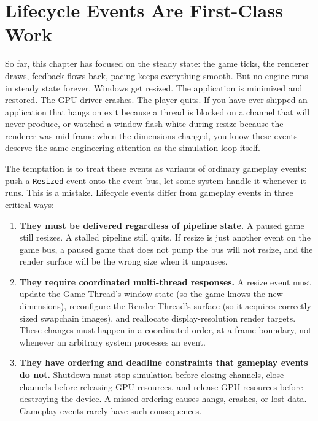 \documentclass[
  11pt,
  letterpaper,
  DIV=11,
  numbers=noendperiod,
  twoside,
  open=right]{scrreprt}
\begin{document}
\section{Lifecycle Events Are First-Class
Work}\label{lifecycle-events-are-first-class-work}

So far, this chapter has focused on the steady state: the game ticks,
the renderer draws, feedback flows back, pacing keeps everything smooth.
But no engine runs in steady state forever. Windows get resized. The
application is minimized and restored. The GPU driver crashes. The
player quits. If you have ever shipped an application that hangs on exit
because a thread is blocked on a channel that will never produce, or
watched a window flash white during resize because the renderer was
mid-frame when the dimensions changed, you know these events deserve the
same engineering attention as the simulation loop itself.

The temptation is to treat these events as variants of ordinary gameplay
events: push a \texttt{Resized} event onto the event bus, let some
system handle it whenever it runs. This is a mistake. Lifecycle events
differ from gameplay events in three critical ways:

\begin{enumerate}
\def\labelenumi{\arabic{enumi}.}
\item
  \textbf{They must be delivered regardless of pipeline state.} A paused
  game still resizes. A stalled pipeline still quits. If resize is just
  another event on the game bus, a paused game that does not pump the
  bus will not resize, and the render surface will be the wrong size
  when it unpauses.
\item
  \textbf{They require coordinated multi-thread responses.} A resize
  event must update the Game Thread's window state (so the game knows
  the new dimensions), reconfigure the Render Thread's surface (so it
  acquires correctly sized swapchain images), and reallocate
  display-resolution render targets. These changes must happen in a
  coordinated order, at a frame boundary, not whenever an arbitrary
  system processes an event.
\item
  \textbf{They have ordering and deadline constraints that gameplay
  events do not.} Shutdown must stop simulation before closing channels,
  close channels before releasing GPU resources, and release GPU
  resources before destroying the device. A missed ordering causes
  hangs, crashes, or lost data. Gameplay events rarely have such
  consequences.
\end{enumerate}
\end{document}
